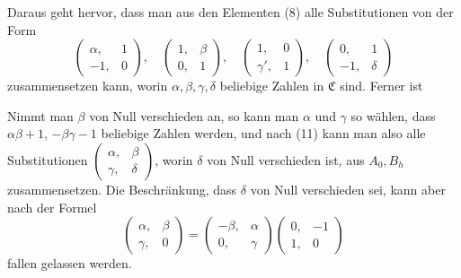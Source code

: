 Daraus geht hervor, dass man aus den Elementen (8) alle Substitutionen von der Form
\[ \begin{pmatrix} \alpha, & 1 \\ -1, & 0 \end{pmatrix}, \quad \begin{pmatrix} 1, & \beta \\ 0, & 1 \end{pmatrix}, \quad \begin{pmatrix} 1, & 0 \\ \gamma', & 1 \end{pmatrix}, \quad \begin{pmatrix} 0, & 1 \\ -1, & \delta \end{pmatrix} \]
zusammensetzen kann, worin $\alpha, \beta, \gamma, \delta$ beliebige Zahlen in $\mathfrak{C}$ sind. Ferner ist

Nimmt man $\beta$ von Null verschieden an, so kann man $\alpha$ und $\gamma$ so w\"ahlen, dass $\alpha\beta + 1$, $-\beta\gamma - 1$ beliebige Zahlen werden, und nach (11) kann man also alle Substitutionen $\begin{pmatrix} \alpha, & \beta \\ \gamma, & \delta \end{pmatrix}$, worin $\delta$ von Null verschieden ist, aus $A_0, B_h$ zusammensetzen. Die Beschr\"ankung, dass $\delta$ von Null verschieden sei, kann aber nach der Formel
\[ \begin{pmatrix} \alpha, & \beta \\ \gamma, & 0 \end{pmatrix} = \begin{pmatrix} -\beta, & \alpha \\ 0, & \gamma \end{pmatrix}\begin{pmatrix} 0, & -1 \\ 1, & 0 \end{pmatrix} \]
fallen gelassen werden.
